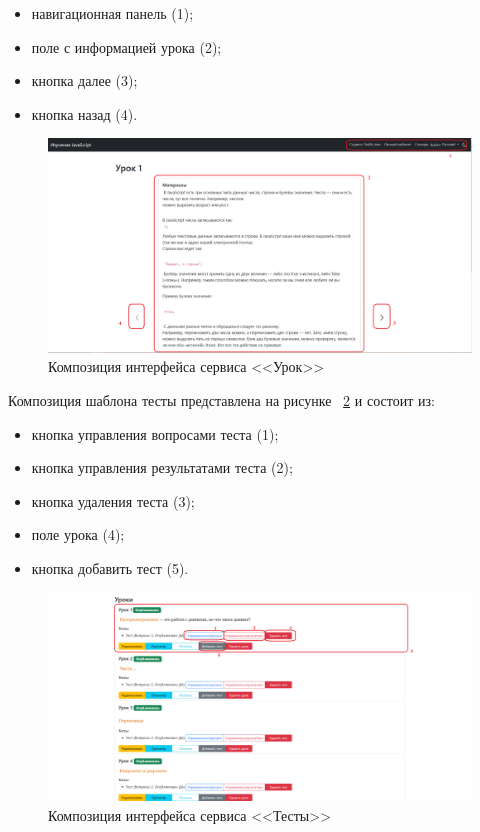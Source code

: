 \begin{itemize}
	\item навигационная панель (1);
	\item поле с информацией урока (2);
	\item кнопка далее (3);
	\item кнопка назад (4).
\end{itemize}

\begin{figure}[h]
	\centering
	\includegraphics[width=1\linewidth]{images/урок}
	\caption{Композиция интерфейса сервиса <<Урок>>}
	\label{templ:image4}
\end{figure}

Композиция шаблона тесты представлена на рисунке ~\ref{templ:image5} и состоит из:

\begin{itemize}
	\item кнопка управления вопросами теста (1);
	\item кнопка управления результатами теста (2);
	\item кнопка удаления теста (3);
	\item поле урока (4);
	\item кнопка добавить тест (5).
\end{itemize}

\begin{figure}[h]
	\centering
	\includegraphics[width=1\linewidth]{images/Тесты}
	\caption{Композиция интерфейса сервиса <<Тесты>>}
	\label{templ:image5}
\end{figure}

